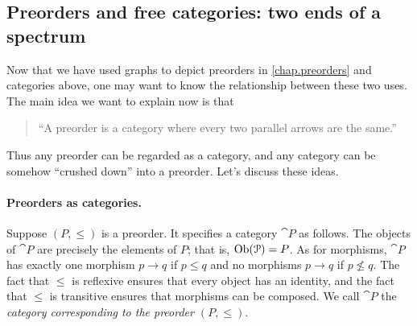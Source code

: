 \documentclass[7Sketches]{subfiles}
\begin{document}
\subsection{Preorders and free categories: two ends of a spectrum}%
\label{subsubsec.pos_free_spectrum}

Now that we have used graphs to depict preorders in \cref{chap.preorders} and categories above, one may want
to know the relationship between these two uses. The main idea we want to explain now is that
\begin{quote}
``A preorder is a category where every two parallel arrows are the same.''
\end{quote}
Thus any preorder can be regarded as a category, and any category can be somehow ``crushed down'' into a preorder. Let's discuss these ideas.

\paragraph{Preorders as categories.}%

Suppose $(P,\leq)$ is a preorder. It specifies a category $\cat{P}$ as follows. The
objects of $\cat{P}$ are precisely the elements of $P$; that is,
$\operatorname{Ob}(\mathcal{P})=P$. As for morphisms, $\cat{P}$ has exactly one morphism $p\to q$ if
$p\leq q$ and no morphisms $p\to q$ if $p\not\leq q$. The fact that $\leq$ is reflexive ensures that every object has an identity, and the fact that $\leq$ is transitive ensures that morphisms can be composed. We call $\cat{P}$ the \emph{category corresponding to the preorder $(P,\leq)$}.%
%
\end{document}
